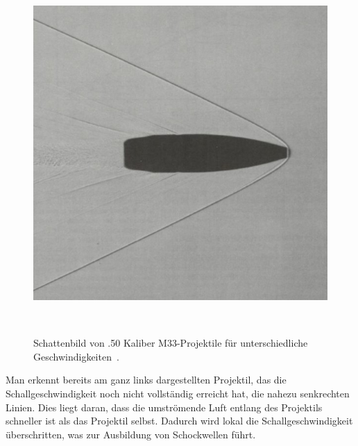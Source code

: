 \begin{figure}
\begin{minipage}[b]{0.32\textwidth}
        \caption*{$1.06\,\mathrm{Mach}$}
    \end{minipage}
    \hfill
    \begin{minipage}[b]{0.32\textwidth}
        \centering
        \includegraphics[width=\linewidth]{papers/ueberschall/figures/2.66_mach_projektil.jpg}
        \caption*{$2.66\,\mathrm{Mach}$}
    \end{minipage}
    \caption{Schattenbild von .50 Kaliber M33-Projektile für unterschiedliche Geschwindigkeiten~\cite{Mittelkaliber2020}.}
~\label{fig:machsche_kegel_projektil}
\end{figure}
Man erkennt bereits am ganz links dargestellten Projektil, 
das die Schallgeschwindigkeit noch nicht vollständig 
erreicht hat, die nahezu senkrechten Linien. 
Dies liegt daran, dass die umströmende Luft entlang 
des Projektils schneller ist als das Projektil selbst. 
Dadurch wird lokal die Schallgeschwindigkeit überschritten, 
was zur Ausbildung von Schockwellen führt.

